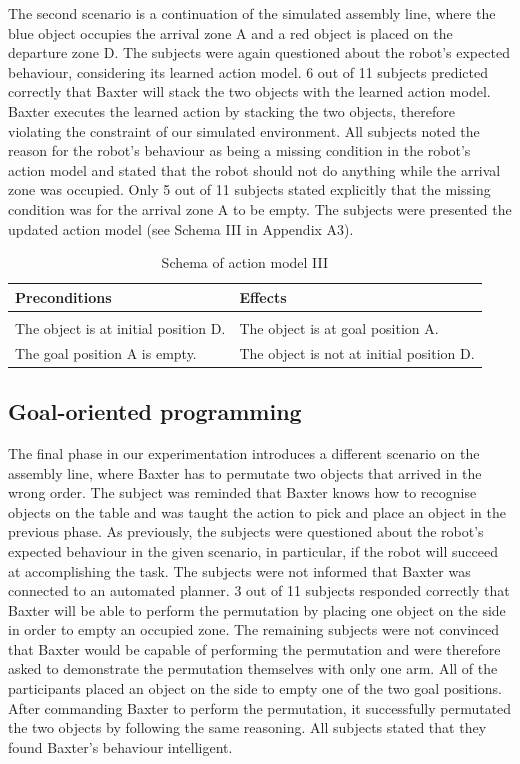 The second scenario is a continuation of the simulated assembly line, where the blue object occupies the arrival zone A and a red object is placed on the departure zone D. The subjects were again questioned about the robot's expected behaviour, considering its learned action model. 6 out of 11 subjects predicted correctly that Baxter will stack the two objects with the learned action model. Baxter executes the learned action by stacking the two objects, therefore violating the constraint of our simulated environment. All subjects noted the reason for the robot's behaviour as being a missing condition in the robot's action model and stated that the robot should not do anything while the arrival zone was occupied. Only 5 out of 11 subjects stated explicitly that the missing condition was for the arrival zone A to be empty. The subjects were presented the updated action model (see Schema III in Appendix A3).
\begin{table}[h]
\begin{center}
\begin{tabular}{l|l}
Preconditions & Effects\\ \hline
 & \\
The object is at initial position D. & The object is at goal position A.\\
The goal position A is empty. & The object is not at initial position D.
\end{tabular}
\end{center}
\label{tab:schema3}
\caption{Schema of action model III}
\end{table}

\subsection{Goal-oriented programming}
The final phase in our experimentation introduces a different scenario on the assembly line, where Baxter has to permutate two objects that arrived in the wrong order. The subject was reminded that Baxter knows how to recognise objects on the table and was taught the action to pick and place an object in the previous phase. As previously, the subjects were questioned about the robot's expected behaviour in the given scenario, in particular, if the robot will succeed at accomplishing the task. The subjects were not informed that Baxter was connected to an automated planner. 3 out of 11 subjects responded correctly that Baxter will be able to perform the permutation by placing one object on the side in order to empty an occupied zone. The remaining subjects were not convinced that Baxter would be capable of performing the permutation and were therefore asked to demonstrate the permutation themselves with only one arm. All of the participants placed an object on the side to empty one of the two goal positions. After commanding Baxter to perform the permutation, it successfully permutated the two objects by following the same reasoning. All subjects stated that they found Baxter's behaviour intelligent.


